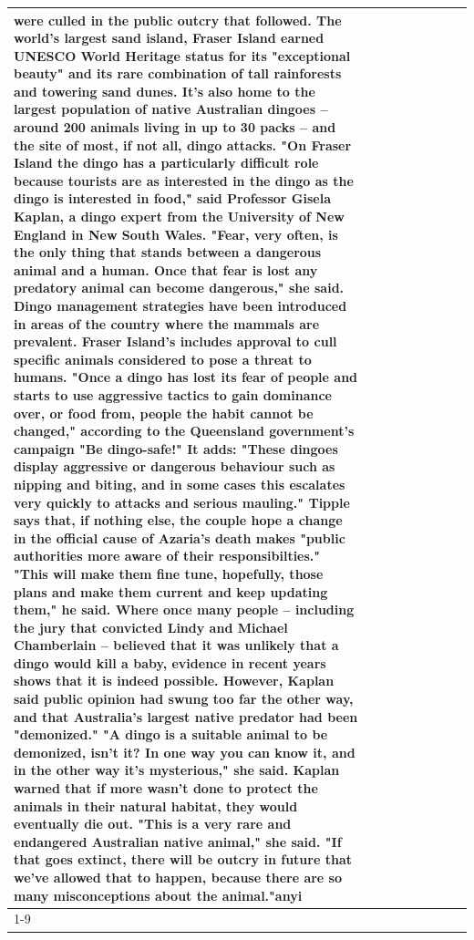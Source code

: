 \begin{table}[H]
\begin{tabular}{lllrlllll}
were culled in the public outcry that followed. The world's largest sand island, Fraser Island earned UNESCO World Heritage status for its "exceptional beauty" and its rare combination of tall rainforests and towering sand dunes. It's also home to the largest population of native Australian dingoes -- around 200 animals living in up to 30 packs -- and the site of most, if not all, dingo attacks. "On Fraser Island the dingo has a particularly difficult role because tourists are as interested in the dingo as the dingo is interested in food," said Professor Gisela Kaplan, a dingo expert from the University of New England in New South Wales. "Fear, very often, is the only thing that stands between a dangerous animal and a human. Once that fear is lost any predatory animal can become dangerous," she said. Dingo management strategies have been introduced in areas of the country where the mammals are prevalent. Fraser Island's includes approval to cull specific animals considered to pose a threat to humans. "Once a dingo has lost its fear of people and starts to use aggressive tactics to gain dominance over, or food from, people the habit cannot be changed," according to the Queensland government's campaign "Be dingo-safe!" It adds: "These dingoes display aggressive or dangerous behaviour such as nipping and biting, and in some cases this escalates very quickly to attacks and serious mauling." Tipple says that, if nothing else, the couple hope a change in the official cause of Azaria's death makes "public authorities more aware of their responsibilties." "This will make them fine tune, hopefully, those plans and make them current and keep updating them," he said. Where once many people -- including the jury that convicted Lindy and Michael Chamberlain -- believed that it was unlikely that a dingo would kill a baby, evidence in recent years shows that it is indeed possible. However, Kaplan said public opinion had swung too far the other way, and that Australia's largest native predator had been "demonized." "A dingo is a suitable animal to be demonized, isn't it? In one way you can know it, and in the other way it's mysterious," she said. Kaplan warned that if more wasn't done to protect the animals in their natural habitat, they would eventually die out. "This is a very rare and endangered Australian native animal," she said. "If that goes extinct, there will be outcry in future that we've allowed that to happen, because there are so many misconceptions about the animal."anyi \\
\cline{1-9}

\end{tabular}
\end{table}

